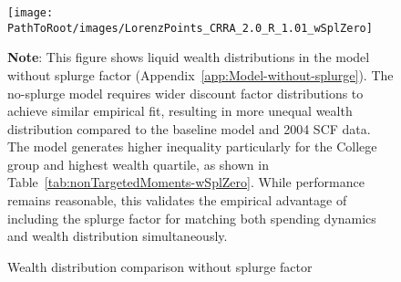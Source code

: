 \documentclass[\PathToRoot/\ProjectName]{subfiles}
\begin{document}
\begin{figure}[htb] 
  \centering
  \caption{Wealth distribution comparison without splurge factor}
  \whenintegrated{\label{fig:LorenzPtsSplZero}} 
  \texttt{[image: \\PathToRoot/images/LorenzPoints\_CRRA\_2.0\_R\_1.01\_wSplZero]}

  \medskip
  \noindent\parbox{\textwidth}{\footnotesize
    \textbf{Note}: This figure shows liquid wealth distributions in the model without splurge factor (Appendix~\ref{app:Model-without-splurge}).
    The no-splurge model requires wider discount factor distributions to achieve similar empirical fit,
    resulting in more unequal wealth distribution compared to the baseline model and 2004 SCF data.
    The model generates higher inequality particularly for the College group and highest wealth quartile,
    as shown in Table~\ref{tab:nonTargetedMoments-wSplZero}. While performance remains reasonable,
    this validates the empirical advantage of including the splurge factor for matching both spending
    dynamics and wealth distribution simultaneously.
  }
\end{figure}

\vspace{0.5em}

\smartbib
\end{document}

